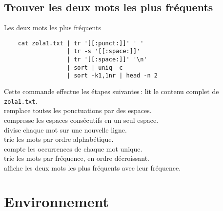 \documentclass[a4paper]{report}
\begin{document}
    \subsection{Trouver les deux mots les plus fréquents}
    \begin{EExample}{Les deux mots les plus fréquents}{}
        \begin{verbatim}
    cat zola1.txt | tr '[[:punct:]]' ' ' 
                  | tr -s '[[:space:]]' 
                  | tr '[[:space:]]' '\n' 
                  | sort | uniq -c 
                  | sort -k1,1nr | head -n 2
        \end{verbatim}
        Cette commande effectue les étapes suivantes :
        lit le contenu complet de \texttt{zola1.txt}. \\
        remplace toutes les ponctuations par des espaces. \\
        compresse les espaces consécutifs en un seul espace. \\
        divise chaque mot sur une nouvelle ligne. \\
        trie les mots par ordre alphabétique. \\
        compte les occurrences de chaque mot unique. \\
        trie les mots par fréquence, en ordre décroissant. \\
        affiche les deux mots les plus fréquents avec leur fréquence.
    \end{EExample}

    \section{Environnement}
\end{document}
